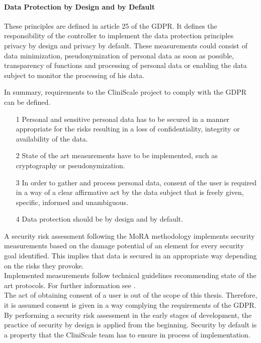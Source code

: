 \paragraph{Data Protection by Design and by Default} These principles are defined in article 25 of the GDPR. It defines the responsibility of the controller to implement the data protection principles  privacy by design and privacy by default. These measurements could consist of data minimization, pseudonymization of personal data as soon as possible, transparency of functions and processing of personal data or enabling the data subject to monitor the processing of his data.\cite{GDPR25}

In summary, requirements to the CliniScale project to comply with the GDPR can be defined.

\begin{itemize}
    \item[1] Personal and sensitive personal data has to be secured in a manner appropriate for the risks resulting in a loss of confidentiality, integrity or availability of the data.
    \item[2] State of the art measurements have to be implemented, such as cryptography or pseudonymization.
    \item[3] In order to gather and process personal data, consent of the user is required in a way of a clear affirmative act by the data subject that is freely given, specific, informed and unambiguous.
    \item[4] Data protection should be by design and by default.
\end{itemize}

A security risk assessment following the MoRA methodology implements security measurements based on the damage potential of an element for every security goal identified. This implies that data is secured in an appropriate way depending on the risks they provoke.\\
Implemented measurements follow technical guidelines recommending state of the art protocols. For further information see \textit{}.\\
The act of obtaining consent of a user is out of the scope of this thesis. Therefore, it is assumed consent is given in a way complying the requirements of the GDPR.\\
By performing a security risk assessment in the early stages of development, the practice of security by design is applied from the beginning. Security by default is a property that the CliniScale team has to ensure in process of implementation.



